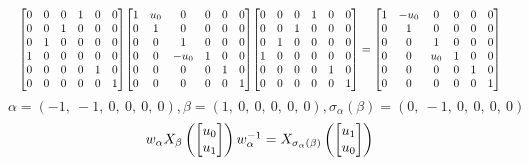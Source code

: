 \documentclass[11pt]{article}
\theoremstyle{definition}
\begin{document}
\[
\scaletoalign{\textwidth}{{\left[\begin{matrix}0 & 0 & 0 & 1 & 0 & 0\\0 & 0 & 1 & 0 & 0 & 0\\0 & 1 & 0 & 0 & 0 & 0\\1 & 0 & 0 & 0 & 0 & 0\\0 & 0 & 0 & 0 & 1 & 0\\0 & 0 & 0 & 0 & 0 & 1\end{matrix}\right]} {\left[\begin{matrix}1 & u_{0} & 0 & 0 & 0 & 0\\0 & 1 & 0 & 0 & 0 & 0\\0 & 0 & 1 & 0 & 0 & 0\\0 & 0 & - u_{0} & 1 & 0 & 0\\0 & 0 & 0 & 0 & 1 & 0\\0 & 0 & 0 & 0 & 0 & 1\end{matrix}\right]} {\left[\begin{matrix}0 & 0 & 0 & 1 & 0 & 0\\0 & 0 & 1 & 0 & 0 & 0\\0 & 1 & 0 & 0 & 0 & 0\\1 & 0 & 0 & 0 & 0 & 0\\0 & 0 & 0 & 0 & 1 & 0\\0 & 0 & 0 & 0 & 0 & 1\end{matrix}\right]} = {\left[\begin{matrix}1 & - u_{0} & 0 & 0 & 0 & 0\\0 & 1 & 0 & 0 & 0 & 0\\0 & 0 & 1 & 0 & 0 & 0\\0 & 0 & u_{0} & 1 & 0 & 0\\0 & 0 & 0 & 0 & 1 & 0\\0 & 0 & 0 & 0 & 0 & 1\end{matrix}\right]}}
\]
\[
\alpha = \left( -1, \  -1, \  0, \  0, \  0, \  0\right), \beta = \left( 1, \  0, \  0, \  0, \  0, \  0\right), \sigma_{\alpha}(\beta) = \left( 0, \  -1, \  0, \  0, \  0, \  0\right)
\]
\[
\scaletoalign{\textwidth}{w_{\alpha} X_{\beta}\left(\left[\begin{matrix}u_{0}\\u_{1}\end{matrix}\right]\right) w_{\alpha}^{-1} = X_{\sigma_{\alpha}\left(\beta\right)}\left(\left[\begin{matrix}u_{1}\\u_{0}\end{matrix}\right]\right)}
\]
\end{document}
